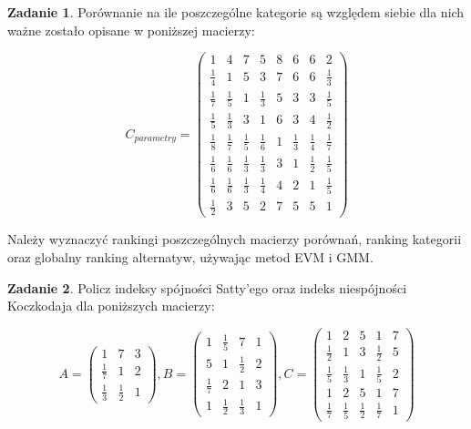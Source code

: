 \documentclass{article}[UTF8]
\theoremstyle{definition}
\newtheorem{zad}{Zadanie}
\begin{document}
\begin{zad}
Porównanie na ile poszczególne kategorie są względem siebie dla nich ważne zostało opisane w poniższej macierzy:

$$C_{parametry}=\begin{pmatrix}
1&4&7&5&8&6&6&2\\
\frac{1}{4}&1&5&3&7&6&6&\frac{1}{3}\\
\frac{1}{7}&\frac{1}{5}&1&\frac{1}{3}&5&3&3&\frac{1}{5}\\
\frac{1}{5}&\frac{1}{3}&3&1&6&3&4&\frac{1}{2}\\
\frac{1}{8}&\frac{1}{7}&\frac{1}{5}&\frac{1}{6}&1&\frac{1}{3}&\frac{1}{4}&\frac{1}{7}\\
\frac{1}{6}&\frac{1}{6}&\frac{1}{3}&\frac{1}{3}&3&1&\frac{1}{2}&\frac{1}{5}\\
\frac{1}{6}&\frac{1}{6}&\frac{1}{3}&\frac{1}{4}&4&2&1&\frac{1}{5}\\
\frac{1}{2}&3&5&2&7&5&5&1
\end{pmatrix}
$$

Należy wyznaczyć rankingi poszczególnych macierzy porównań, ranking kategorii oraz globalny ranking alternatyw, używając metod EVM i GMM.


\end{zad}

\begin{zad}

Policz indeksy spójności Satty'ego oraz indeks niespójności Koczkodaja dla poniższych macierzy:

$$
A = \begin{pmatrix}
1&7&3\\
\frac{1}{7}&1&2\\
\frac{1}{3}&\frac{1}{2}&1
\end{pmatrix},
B=\begin{pmatrix}
1&\frac{1}{5}&7&1\\
5&1&\frac{1}{2}&2\\
\frac{1}{7}&2&1&3\\
1&\frac{1}{2}&\frac{1}{3}&1
\end{pmatrix},
C=\begin{pmatrix}
1&2&5&1&7\\
\frac{1}{2}&1&3&\frac{1}{2}&5\\
\frac{1}{5}&\frac{1}{3}&1&\frac{1}{5}&2\\
1&2&5&1&7\\
\frac{1}{7}&\frac{1}{5}&\frac{1}{2}&\frac{1}{7}&1
\end{pmatrix}
$$


\end{zad}
\end{document}
